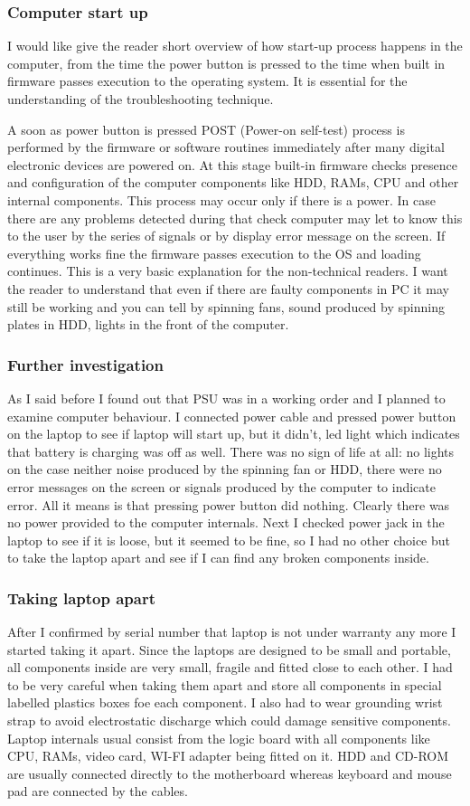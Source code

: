 \documentclass[10pt,a4paper,headinclude=true]{report}
\begin{document}
\subsubsection{Computer start up}
I would like give the reader short overview of how start-up process happens in the computer, from the time the power button is pressed to the time when built in firmware passes execution to the operating system. It is essential for the understanding of the troubleshooting technique.  

A soon as power button is pressed POST (Power-on self-test) process is performed by the firmware or software routines immediately after many digital electronic devices are powered on\cite{POST}. At this stage built-in firmware checks presence and configuration of the computer components like HDD, RAMs, CPU and other internal components. This process may occur only if there is a power. In case there are any problems detected during that check computer may let to know this to the user by the series of signals or by display error message on the screen. If everything works fine the firmware passes execution to the OS and loading continues. This is a very basic explanation for the non-technical readers. I want the reader to understand that even if there are faulty components in PC it may still be working and you can tell by spinning fans, sound produced by spinning plates in HDD, lights in the front of the computer.
\subsubsection{Further investigation}
As I said before I found out that PSU was in a working order and I planned to examine computer behaviour. I connected power cable and pressed power button on the laptop to see if laptop will start up, but it didn't, led light which indicates that battery is charging was off as well. There was no sign of life at all: no lights on the case neither noise produced by the spinning fan or HDD, there were no error messages on the screen or signals produced by the computer to indicate error. All it means is that pressing power button did nothing. Clearly there was no power provided to the computer internals. Next I checked power jack in the laptop to see if it is loose, but it seemed to be fine, so I had no other choice but to take the laptop apart and see if I can find any broken components inside. 
\subsubsection{Taking laptop apart}
After I confirmed by serial number that laptop is not under warranty any more I started taking it apart. Since the laptops are designed to be small and portable, all components inside are very small, fragile and fitted close to each other. I had to be very careful when taking them apart and store all components in special labelled plastics boxes foe each component. I also had to wear grounding wrist strap to avoid electrostatic discharge which could damage sensitive components. Laptop internals usual consist from the logic board with all components like CPU, RAMs, video card, WI-FI adapter being fitted on it. HDD and CD-ROM are usually connected directly to the motherboard whereas keyboard and mouse pad are connected by the cables. 
\end{document}
